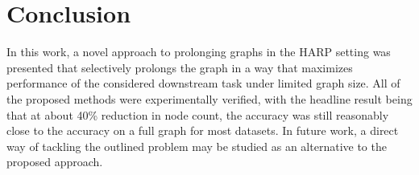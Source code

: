 \section{Conclusion}

In this work, a novel approach to prolonging graphs in the HARP setting was presented that selectively prolongs the graph in a way that maximizes performance of the considered downstream task under limited graph size. All of the proposed methods were experimentally verified, with the headline result being that at about 40\% reduction in node count, the accuracy was still reasonably close to the accuracy on a full graph for most datasets. In future work, a direct way of tackling the outlined problem may be studied as an alternative to the proposed approach.

